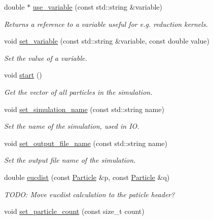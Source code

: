 \begin{DoxyCompactItemize}
double $\ast$ \mbox{\hyperlink{namespacewash_ad9a1f6575e74c6c12ddbae8d58c2b478}{use\+\_\+variable}} (const std\+::string \&variable)
\begin{DoxyCompactList}\small\item\em Returns a reference to a variable useful for e.\+g. reduction kernels. \end{DoxyCompactList}\item 
void \mbox{\hyperlink{namespacewash_a5045909b6d97db3d92cc44bfd5df70ee}{set\+\_\+variable}} (const std\+::string \&variable, const double value)
\begin{DoxyCompactList}\small\item\em Set the value of a variable. \end{DoxyCompactList}\item 
void \mbox{\hyperlink{namespacewash_a4c8a9913a535b341da9e72826916544b}{start}} ()
\begin{DoxyCompactList}\small\item\em Get the vector of all particles in the simulation. \end{DoxyCompactList}\item 
void \mbox{\hyperlink{namespacewash_a4ddbab848bef96e0fc69bf8e280d4775}{set\+\_\+simulation\+\_\+name}} (const std\+::string name)
\begin{DoxyCompactList}\small\item\em Set the name of the simulation, used in IO. \end{DoxyCompactList}\item 
void \mbox{\hyperlink{namespacewash_ad6de17b9a27f58f6245a68ede303e84b}{set\+\_\+output\+\_\+file\+\_\+name}} (const std\+::string name)
\begin{DoxyCompactList}\small\item\em Set the output file name of the simulation. \end{DoxyCompactList}\item 
double \mbox{\hyperlink{namespacewash_aecf1c6d565098a830dfeb491a4638093}{eucdist}} (const \mbox{\hyperlink{classwash_1_1Particle}{Particle}} \&p, const \mbox{\hyperlink{classwash_1_1Particle}{Particle}} \&q)
\begin{DoxyCompactList}\small\item\em T\+O\+DO\+: Move eucdist calculation to the paticle header? \end{DoxyCompactList}\item 
void \mbox{\hyperlink{namespacewash_a20a6940ce5a881482fe472ed704f177e}{set\+\_\+particle\+\_\+count}} (const size\+\_\+t count)

\end{DoxyCompactItemize}
